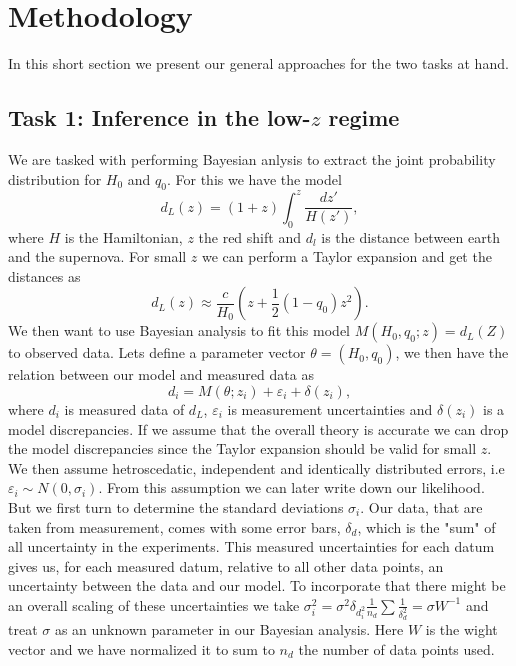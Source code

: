 \documentclass[11pt,a4paper]{article}
\begin{document}
 
\section{Methodology}
In this short section we present our general approaches for the two tasks at hand.

\subsection[Task 1]{Task 1: Inference in the low-$z$ regime}
We are tasked with performing Bayesian anlysis to extract the joint probability distribution for $H_0$ and $q_0$. For this we have the model \begin{equation*}
    d_L(z) = (1 + z )\int_0^z \frac{dz'}{H(z')},
\end{equation*}
where $H$ is the Hamiltonian, $z$ the red shift and $d_l$ is the distance between earth and the supernova. For small $z$ we can perform a Taylor expansion and get the distances as 
\begin{equation*}
    d_L(z) \approx \frac{c}{H_0} (z + \frac{1}{2}(1 - q_0)z^2).
\end{equation*}
We then want to use Bayesian analysis to fit this model $M(H_0,q_0; z) = d_L(Z)$ to observed data. Lets define a parameter vector $\theta = (H_0, q_0)$, we then have the relation between our model and measured data as
\begin{equation*}
    d_i = M(\theta; z_i) + \varepsilon_i + \delta(z_i),
\end{equation*}
where $d_i$ is measured data of $d_L$, $\varepsilon_i$ is measurement uncertainties and $\delta(z_i)$ is a model discrepancies. If we assume that the overall theory is accurate we can drop the model discrepancies since the Taylor expansion should be valid for small $z$. We then assume hetroscedatic, independent and identically distributed errors, i.e $\varepsilon_i \sim N(0, \sigma_i)$. From this assumption we can later write down our likelihood. But we first turn to determine the standard deviations $\sigma_i$. Our data, that are taken from measurement, comes with some error bars, $\delta_d$, which is the "sum" of all uncertainty in the experiments. This measured uncertainties for each datum gives us, for each measured datum,  relative to all other data points, an uncertainty between the data and our model. To incorporate that there might be an overall scaling of these uncertainties we take $\sigma_i^2 = \sigma^2 \delta_d_i^2 \frac{1}{n_d}\sum \frac{1}{\delta_d^2} = \sigma W^{-1}$ and treat $\sigma$ as an unknown parameter in our Bayesian analysis. Here $W$ is the wight vector and we have normalized it to sum to $n_d$ the number of data points used.
\end{document}
